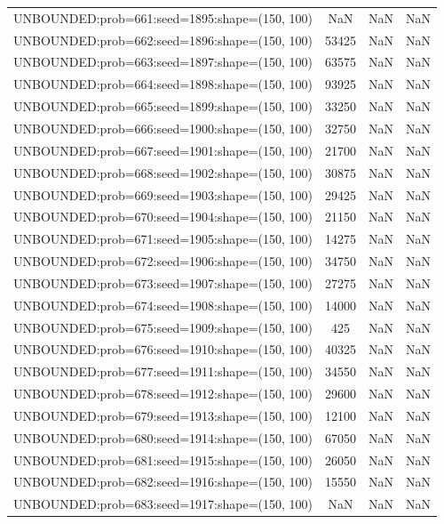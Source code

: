 \begin{longtable}{lccc}
UNBOUNDED:prob=661:seed=1895:shape=(150, 100) &   NaN &   NaN &    NaN \\
UNBOUNDED:prob=662:seed=1896:shape=(150, 100) & 53425 &   NaN &    NaN \\
UNBOUNDED:prob=663:seed=1897:shape=(150, 100) & 63575 &   NaN &    NaN \\
UNBOUNDED:prob=664:seed=1898:shape=(150, 100) & 93925 &   NaN &    NaN \\
UNBOUNDED:prob=665:seed=1899:shape=(150, 100) & 33250 &   NaN &    NaN \\
UNBOUNDED:prob=666:seed=1900:shape=(150, 100) & 32750 &   NaN &    NaN \\
UNBOUNDED:prob=667:seed=1901:shape=(150, 100) & 21700 &   NaN &    NaN \\
UNBOUNDED:prob=668:seed=1902:shape=(150, 100) & 30875 &   NaN &    NaN \\
UNBOUNDED:prob=669:seed=1903:shape=(150, 100) & 29425 &   NaN &    NaN \\
UNBOUNDED:prob=670:seed=1904:shape=(150, 100) & 21150 &   NaN &    NaN \\
UNBOUNDED:prob=671:seed=1905:shape=(150, 100) & 14275 &   NaN &    NaN \\
UNBOUNDED:prob=672:seed=1906:shape=(150, 100) & 34750 &   NaN &    NaN \\
UNBOUNDED:prob=673:seed=1907:shape=(150, 100) & 27275 &   NaN &    NaN \\
UNBOUNDED:prob=674:seed=1908:shape=(150, 100) & 14000 &   NaN &    NaN \\
UNBOUNDED:prob=675:seed=1909:shape=(150, 100) &   425 &   NaN &    NaN \\
UNBOUNDED:prob=676:seed=1910:shape=(150, 100) & 40325 &   NaN &    NaN \\
UNBOUNDED:prob=677:seed=1911:shape=(150, 100) & 34550 &   NaN &    NaN \\
UNBOUNDED:prob=678:seed=1912:shape=(150, 100) & 29600 &   NaN &    NaN \\
UNBOUNDED:prob=679:seed=1913:shape=(150, 100) & 12100 &   NaN &    NaN \\
UNBOUNDED:prob=680:seed=1914:shape=(150, 100) & 67050 &   NaN &    NaN \\
UNBOUNDED:prob=681:seed=1915:shape=(150, 100) & 26050 &   NaN &    NaN \\
UNBOUNDED:prob=682:seed=1916:shape=(150, 100) & 15550 &   NaN &    NaN \\
UNBOUNDED:prob=683:seed=1917:shape=(150, 100) &   NaN &   NaN &    NaN \\

\end{longtable}
